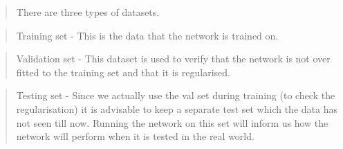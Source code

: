 \documentclass[11pt]{article}
\begin{document}
    \begin{quote}
There are three types of datasets.
\end{quote}

\begin{quote}
Training set - This is the data that the network is trained on.
\end{quote}

\begin{quote}
Validation set - This dataset is used to verify that the network is not
over fitted to the training set and that it is regularised.
\end{quote}

\begin{quote}
Testing set - Since we actually use the val set during training (to
check the regularisation) it is advisable to keep a separate test set
which the data has not seen till now. Running the network on this set
will inform us how the network will perform when it is tested in the
real world.
\end{quote}
\end{document}
